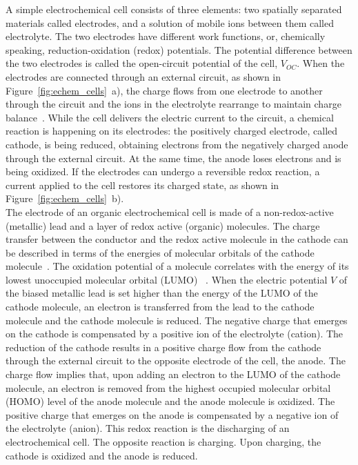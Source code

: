 A simple electrochemical cell consists of three elements: two spatially separated materials called electrodes, and a solution of mobile ions between them called electrolyte. The two electrodes have different work functions, or, chemically speaking, reduction-oxidation (redox) potentials. The potential difference between the two electrodes is called the open-circuit potential of the cell, $V_{OC}$. When the electrodes are connected through an external circuit, as shown in Figure~\ref{fig:echem_cells}~a), the charge flows from one electrode to another through the circuit and the ions in the electrolyte rearrange to maintain charge balance~\cite{muench2016_chemrev}. While the cell delivers the electric current to the circuit, a chemical reaction is happening on its electrodes: the positively charged electrode, called cathode, is being reduced, obtaining electrons from the negatively charged anode through the external circuit. At the same time, the anode loses electrons and is being oxidized. If the electrodes can undergo a reversible redox reaction, a current applied to the cell restores its charged state, as shown in Figure~\ref{fig:echem_cells}~b).\\

The electrode of an organic electrochemical cell is made of a non-redox-active (metallic) lead and a layer of redox active (organic) molecules. The charge transfer between the conductor and the redox active molecule in the cathode can be described in terms of the energies of molecular orbitals of the cathode molecule~\cite{DOM,Wu_2023}. The oxidation potential of a molecule correlates with the energy of its lowest unoccupied molecular orbital (LUMO) ~\cite{Wu_2023}. When the electric potential $V$ of the biased metallic lead is set higher than the energy of the LUMO of the cathode molecule, an electron is transferred from the lead to the cathode molecule and the cathode molecule is reduced. The negative charge that emerges on the cathode is compensated by a positive ion of the electrolyte (cation). The reduction of the cathode results in a positive charge flow from the cathode through the external circuit to the opposite electrode of the cell, the anode. The charge flow implies that, upon adding an electron to the LUMO of the cathode molecule, an electron is removed from the highest occupied molecular orbital (HOMO) level of the anode molecule and the anode molecule is oxidized. The positive charge that emerges on the anode is compensated by a negative ion of the electrolyte (anion). This redox reaction is the discharging of an electrochemical cell. The opposite reaction is charging. Upon charging, the cathode is oxidized and the anode is reduced.\\

